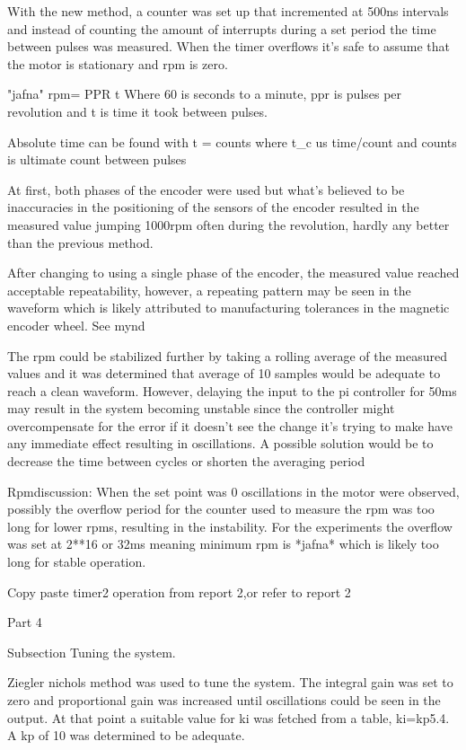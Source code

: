 With the new method, a counter was set up that incremented at 500ns intervals and instead of counting the amount of interrupts during a set period the time between pulses was measured. When the timer overflows it's safe to assume that the motor is stationary and rpm is zero. 

"jafna" rpm=\frac{60\cdot} {PPR} \cdot t
Where 60 is seconds to a minute, ppr is pulses per revolution and t is time it took between pulses. 

Absolute time can be found with t =  {counts}  where t_c us time/count and counts is ultimate count between pulses 

At first, both phases of the encoder were used but what's believed to be inaccuracies in the positioning of the sensors of the encoder resulted in the measured value jumping 1000rpm often during the revolution, hardly any better than the previous method.

After changing to using a single phase of the encoder, the measured value reached acceptable repeatability, however, a repeating pattern may be seen in the waveform which is  likely attributed to manufacturing tolerances in the magnetic encoder wheel. See mynd

The rpm could be stabilized further by taking a rolling average of the measured values and it was determined that average of 10 samples would be adequate to reach a clean waveform. However, delaying the input to the pi controller for 50ms may result in the system becoming unstable since the controller might overcompensate for the error if it doesn't see the change it's trying to make have any immediate effect resulting in oscillations. A possible solution would be to decrease the time between cycles or shorten the averaging period

Rpmdiscussion:
When the set point was 0 oscillations in the motor were observed, possibly the overflow period for the counter used to measure the rpm was too long for lower rpms, resulting in the instability. For the experiments the overflow was set at 2**16 or 32ms meaning minimum rpm is *jafna* which is likely too long for stable operation. 

Copy paste timer2 operation from report 2,or refer to report 2


Part 4

Subsection Tuning the system. 

Ziegler nichols method was used to tune the system. The integral gain was set to zero and proportional gain was increased until oscillations could be seen in the output. At that point a suitable value for ki was fetched from a table, ki=kp5.4. A kp of 10 was determined to be adequate. 

